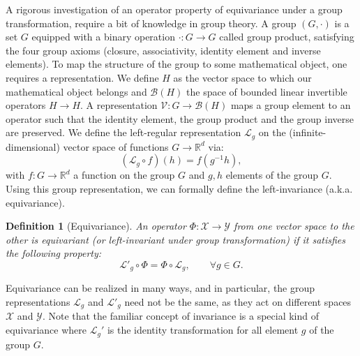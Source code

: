 \documentclass{article}
\newtheorem{definition}{Definition}[section]
\begin{document}
A rigorous investigation of an operator property of equivariance under a group transformation, require a bit of knowledge in group theory. A group $(G, \cdot)$ is a set $G$ equipped with a binary operation $\cdot : G \to G$ called group product, satisfying the four group axioms (closure, associativity, identity element and inverse elements). To map the structure of the group to some mathematical object, one requires a representation. We define $H$ as the vector space to which our mathematical object belongs and $\mathcal{B}(H)$ the space of bounded linear invertible operators $H \to H$. A representation $\mathcal{V} : G \to \mathcal{B}(H)$ maps a group element to an operator such that the identity element, the group product and the group inverse are preserved. We define the left-regular representation $\mathcal{L}_g$ on the (infinite-dimensional) vector space of functions $G \to \mathbb{R}^d$ via:
\begin{equation}
(\mathcal{L}_g \circ f )(h) = f(g^{-1}h),
\end{equation}
with $f : G \to \mathbb{R}^d$ a function on the group $G$ and $g, h$ elements of the group $G$. Using this group representation, we can formally define the left-invariance (a.k.a. equivariance).

\begin{definition}[Equivariance] \label{def:equivariance}
An operator $\Phi : \mathcal{X} \to \mathcal{Y}$ from one vector space to the other is equivariant (or left-invariant under group transformation) if it satisfies the following property:
\begin{equation}
\mathcal{L}'_g \circ \Phi = \Phi \circ \mathcal{L}_g, \qquad \forall g \in G.
\end{equation}
\end{definition}

Equivariance can be realized in many ways, and in particular, the group representations $\mathcal{L}_g$ and $\mathcal{L}'_g$ need not be the same, as they act on different spaces $\mathcal{X}$ and $\mathcal{Y}$. Note that the familiar concept of invariance is a special kind of equivariance where  $\mathcal{L}_g'$ is the identity transformation for all element $g$ of the group $G$. 


\end{document}
